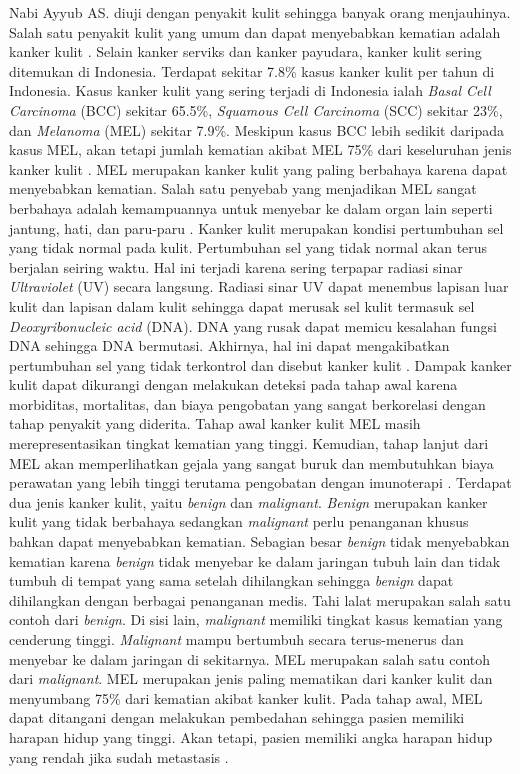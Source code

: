     Nabi Ayyub AS. diuji dengan penyakit kulit sehingga banyak orang menjauhinya. Salah satu penyakit kulit yang umum dan dapat menyebabkan kematian adalah kanker kulit \citep{Nurlitasari2022}. Selain kanker serviks dan kanker payudara, kanker kulit sering ditemukan di Indonesia. Terdapat sekitar 7.8\% kasus kanker kulit per tahun di Indonesia. Kasus kanker kulit yang sering terjadi di Indonesia ialah \textit{Basal Cell Carcinoma} (BCC) sekitar 65.5\%, \textit{Squamous Cell Carcinoma} (SCC) sekitar 23\%, dan \textit{Melanoma} (MEL) sekitar 7.9\%. Meskipun kasus BCC lebih sedikit daripada kasus MEL, akan tetapi jumlah kematian akibat MEL 75\% dari keseluruhan jenis kanker kulit \citep{Fuadah2020a}. MEL merupakan kanker kulit yang paling berbahaya karena dapat menyebabkan kematian. Salah satu penyebab yang menjadikan MEL sangat berbahaya adalah kemampuannya untuk menyebar ke dalam organ lain seperti jantung, hati, dan paru-paru \citep{Nugroho2019}. Kanker kulit merupakan kondisi pertumbuhan sel yang tidak normal pada kulit. Pertumbuhan sel yang tidak normal akan terus berjalan seiring waktu. Hal ini terjadi karena sering terpapar radiasi sinar \textit{Ultraviolet} (UV) secara langsung. Radiasi sinar UV dapat menembus lapisan luar kulit dan lapisan dalam kulit sehingga dapat merusak sel kulit termasuk sel \textit{Deoxyribonucleic acid} (DNA). DNA yang rusak dapat memicu kesalahan fungsi DNA sehingga DNA bermutasi. Akhirnya, hal ini dapat mengakibatkan pertumbuhan sel yang tidak terkontrol dan disebut kanker kulit \citep{Bhimavarapu2022}. Dampak kanker kulit dapat dikurangi dengan melakukan deteksi pada tahap awal karena morbiditas, mortalitas, dan biaya pengobatan yang sangat berkorelasi dengan tahap penyakit yang diderita. Tahap awal kanker kulit MEL masih merepresentasikan tingkat kematian yang tinggi. Kemudian, tahap lanjut dari MEL akan memperlihatkan gejala yang sangat buruk dan membutuhkan biaya perawatan yang lebih tinggi terutama pengobatan dengan imunoterapi \citep{Janda2022}. Terdapat dua jenis kanker kulit, yaitu \textit{benign} dan \textit{malignant}. \textit{Benign} merupakan kanker kulit yang tidak berbahaya sedangkan \textit{malignant} perlu penanganan khusus bahkan dapat menyebabkan kematian. Sebagian besar \textit{benign} tidak menyebabkan kematian karena \textit{benign} tidak menyebar ke dalam jaringan tubuh lain dan tidak tumbuh di tempat yang sama setelah dihilangkan sehingga \textit{benign} dapat dihilangkan dengan berbagai penanganan medis. Tahi lalat merupakan salah satu contoh dari \textit{benign}. Di sisi lain, \textit{malignant} memiliki tingkat kasus kematian yang cenderung tinggi. \textit{Malignant} mampu bertumbuh secara terus-menerus dan menyebar ke dalam jaringan di sekitarnya. MEL merupakan salah satu contoh dari \textit{malignant}. MEL merupakan jenis paling mematikan dari kanker kulit dan menyumbang 75\% dari kematian akibat kanker kulit. Pada tahap awal, MEL dapat ditangani dengan melakukan pembedahan sehingga pasien memiliki harapan hidup yang tinggi. Akan tetapi, pasien memiliki angka harapan hidup yang rendah jika sudah metastasis \citep{Davis2019}.

